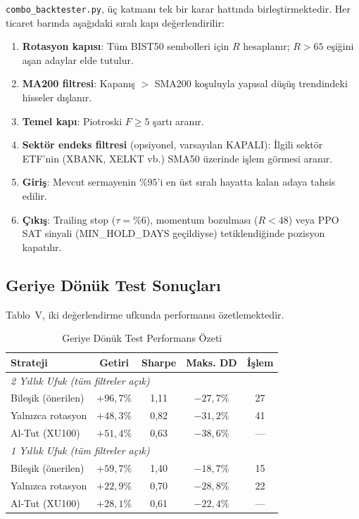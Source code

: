 \documentclass[journal]{IEEEtran}
\begin{document}
\texttt{combo\_backtester.py}, üç katmanı tek bir karar hattında
birleştirmektedir. Her ticaret barında aşağıdaki sıralı kapı
değerlendirilir:

\begin{enumerate}
\item \textbf{Rotasyon kapısı}: Tüm BIST50 sembolleri için $R$
      hesaplanır; $R > 65$ eşiğini aşan adaylar elde tutulur.
\item \textbf{MA200 filtresi}: Kapanış $>$ SMA200 koşuluyla yapısal
      düşüş trendindeki hisseler dışlanır.
\item \textbf{Temel kapı}: Piotroski $F \geq 5$ şartı aranır.
\item \textbf{Sektör endeks filtresi} (opsiyonel, varsayılan KAPALI):
      İlgili sektör ETF'nin (XBANK, XELKT vb.) SMA50 üzerinde işlem
      görmesi aranır.
\item \textbf{Giriş}: Mevcut sermayenin $\%95$'i en üst sıralı hayatta
      kalan adaya tahsis edilir.
\item \textbf{Çıkış}: Trailing stop ($\tau=\%6$), momentum bozulması
      ($R < 48$) veya PPO SAT sinyali (MIN\_HOLD\_DAYS geçildiyse)
      tetiklendiğinde pozisyon kapatılır.
\end{enumerate}

\subsection{Geriye Dönük Test Sonuçları}

Tablo~V, iki değerlendirme ufkunda performansı özetlemektedir.

\begin{table}[ht]
\caption{Geriye Dönük Test Performans Özeti}
\label{tab:results}
\centering
\renewcommand{\arraystretch}{1.2}
\begin{tabular}{lcccc}
\toprule
\textbf{Strateji} & \textbf{Getiri} & \textbf{Sharpe} & \textbf{Maks. DD} & \textbf{İşlem} \\
\midrule
\multicolumn{5}{l}{\textit{2 Yıllık Ufuk (tüm filtreler açık)}} \\
Bileşik (önerilen)   & $+96{,}7\%$ & 1,11 & $-27{,}7\%$ & 27 \\
Yalnızca rotasyon    & $+48{,}3\%$ & 0,82 & $-31{,}2\%$ & 41 \\
Al-Tut (XU100)       & $+51{,}4\%$ & 0,63 & $-38{,}6\%$ & — \\
\midrule
\multicolumn{5}{l}{\textit{1 Yıllık Ufuk (tüm filtreler açık)}} \\
Bileşik (önerilen)   & $+59{,}7\%$ & 1,40 & $-18{,}7\%$ & 15 \\
Yalnızca rotasyon    & $+22{,}9\%$ & 0,70 & $-28{,}8\%$ & 22 \\
Al-Tut (XU100)       & $+28{,}1\%$ & 0,61 & $-22{,}4\%$ & — \\
\bottomrule
\end{tabular}
\end{table}
\end{document}
